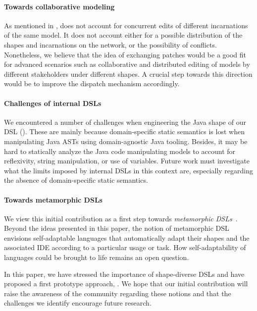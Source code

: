 \paragraph{Towards collaborative modeling}
As mentioned in , \prism does not account for concurrent edits of different incarnations of the same model.
It does not account either for a possible distribution of the shapes and incarnations on the network, or the possibility of conflicts.
Nonetheless, we believe that the idea of exchanging patches would be a good fit for advanced scenarios such as collaborative and distributed editing of models by different stakeholders under different shapes.
A crucial step towards this direction would be to improve the dispatch mechanism accordingly.

\paragraph{Challenges of internal DSLs}
We encountered a number of challenges when engineering the Java shape of our DSL ().
These are mainly because domain-specific static semantics is lost when manipulating Java ASTs using domain-agnostic Java tooling.
Besides, it may be hard to statically analyze the Java code manipulating models to account for reflexivity, string manipulation, or use of variables.
Future work must investigate what the limits imposed by internal DSLs in this context are, especially regarding the absence of domain-specific static semantics.

\paragraph{Towards metamorphic DSLs}
We view this initial contribution as a first step towards \emph{metamorphic DSLs}~\cite{acher2014metamorphic}.
Beyond the ideas presented in this paper, the notion of metamorphic DSL envisions self-adaptable languages that automatically adapt their shapes and the associated IDE according to a particular usage or task.
How self-adaptability of languages could be brought to life remains an open question.

\vspace{1em}
In this paper, we have stressed the importance of shape-diverse DSLs and have proposed a first prototype approach, \prism.
We hope that our initial contribution will raise the awareness of the community regarding these notions and that the challenges we identify encourage future research.
